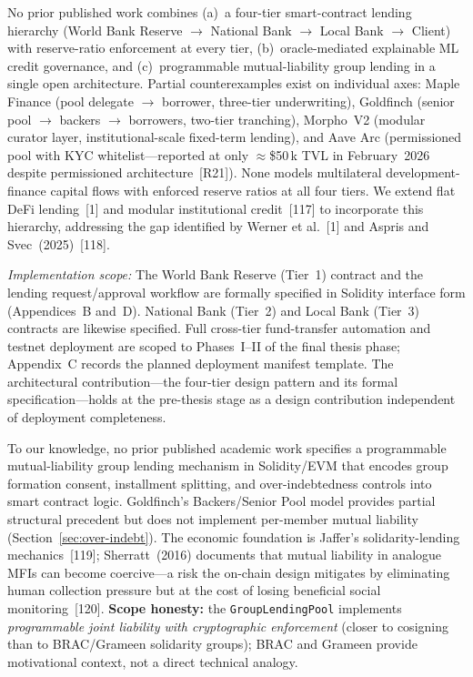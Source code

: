 \documentclass[12pt,a4paper]{report}
\begin{document}
\begin{description}[leftmargin=0pt]

\item[\textbf{Contribution 1 --- Four-Tier Hierarchical DeFi Architecture.}]
No prior published work combines (a)~a four-tier smart-contract lending hierarchy (World Bank Reserve $\to$ National Bank $\to$ Local Bank $\to$ Client) with reserve-ratio enforcement at every tier, (b)~oracle-mediated explainable ML credit governance, and (c)~programmable mutual-liability group lending in a single open architecture. Partial counterexamples exist on individual axes: Maple Finance (pool delegate $\to$ borrower, three-tier underwriting), Goldfinch (senior pool $\to$ backers $\to$ borrowers, two-tier tranching), Morpho~V2 (modular curator layer, institutional-scale fixed-term lending), and Aave Arc (permissioned pool with KYC whitelist---reported at only $\approx$\$50\,k TVL in February~2026 despite permissioned architecture~[R21]). None models multilateral development-finance capital flows with enforced reserve ratios at all four tiers. We extend flat DeFi lending~[1] and modular institutional credit~[117] to incorporate this hierarchy, addressing the gap identified by Werner et al.~[1] and Aspris and Svec~(2025)~[118].

\textit{Implementation scope:} The World Bank Reserve (Tier~1) contract and the lending request/approval workflow are formally specified in Solidity interface form (Appendices~B and~D). National Bank (Tier~2) and Local Bank (Tier~3) contracts are likewise specified. Full cross-tier fund-transfer automation and testnet deployment are scoped to Phases~I--II of the final thesis phase; Appendix~C records the planned deployment manifest template. The architectural contribution---the four-tier design pattern and its formal specification---holds at the pre-thesis stage as a design contribution independent of deployment completeness.

\item[\textbf{Contribution 2 --- On-Chain Solidarity Group Lending.}]
To our knowledge, no prior published academic work specifies a programmable mutual-liability group lending mechanism in Solidity/EVM that encodes group formation consent, installment splitting, and over-indebtedness controls into smart contract logic. Goldfinch's Backers/Senior Pool model provides partial structural precedent but does not implement per-member mutual liability (Section~\ref{sec:over-indebt}). The economic foundation is Jaffer's solidarity-lending mechanics~[119]; Sherratt~(2016) documents that mutual liability in analogue MFIs can become coercive---a risk the on-chain design mitigates by eliminating human collection pressure but at the cost of losing beneficial social monitoring~[120]. \textbf{Scope honesty:} the \texttt{GroupLendingPool} implements \textit{programmable joint liability with cryptographic enforcement} (closer to cosigning than to BRAC/Grameen solidarity groups); BRAC and Grameen provide motivational context, not a direct technical analogy.


\end{description}
\end{document}
